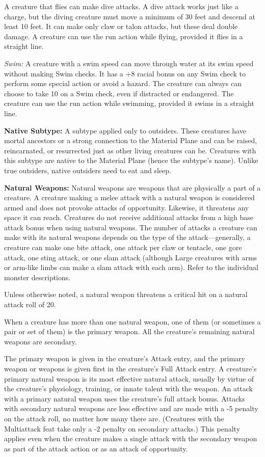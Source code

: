 \documentclass{article}
\begin{document}
A creature that flies can make dive attacks. A dive attack works just like a charge, 
but the diving creature must move a minimum of 30 feet and descend at least 10 
feet. It can make only claw or talon attacks, but these deal double damage. A creature 
can use the run action while flying, provided it flies in a straight line. 

\textit{Swim: }A creature with a swim speed can move through water at its swim 
speed without making Swim checks. It has a +8 racial bonus on any Swim check to 
perform some special action or avoid a hazard. The creature can always can choose 
to take 10 on a Swim check, even if distracted or endangered. The creature can 
use the run action while swimming, provided it swims in a straight line. 

\vspace{12pt}
\textbf{Native Subtype:} A subtype applied only to outsiders. These creatures have 
mortal ancestors or a strong connection to the Material Plane and can be raised, 
reincarnated, or resurrected just as other living creatures can be. Creatures with 
this subtype are native to the Material Plane (hence the subtype's name). Unlike 
true outsiders, native outsiders need to eat and sleep. 

\vspace{12pt}
\textbf{Natural Weapons:} Natural weapons are weapons that are physically a part 
of a creature. A creature making a melee attack with a natural weapon is considered 
armed and does not provoke attacks of opportunity. Likewise, it threatens any space 
it can reach. Creatures do not receive additional attacks from a high base attack 
bonus when using natural weapons. The number of attacks a creature can make with 
its natural weapons depends on the type of the attack---generally, a creature can 
make one bite attack, one attack per claw or tentacle, one gore attack, one sting 
attack, or one slam attack (although Large creatures with arms or arm-like limbs 
can make a slam attack with each arm). Refer to the individual monster descriptions.

Unless otherwise noted, a natural weapon threatens a critical hit on a natural 
attack roll of 20.

When a creature has more than one natural weapon, one of them (or sometimes a pair 
or set of them) is the primary weapon. All the creature's remaining natural weapons 
are secondary. 

The primary weapon is given in the creature's Attack entry, and the primary weapon 
or weapons is given first in the creature's Full Attack entry. A creature's primary 
natural weapon is its most effective natural attack, usually by virtue of the creature's 
physiology, training, or innate talent with the weapon. An attack with a primary 
natural weapon uses the creature's full attack bonus. Attacks with secondary natural 
weapons are less effective and are made with a -5 penalty on the attack roll, no 
matter how many there are. (Creatures with the Multiattack feat take only a -2 
penalty on secondary attacks.) This penalty applies even when the creature makes 
a single attack with the secondary weapon as part of the attack action or as an 
attack of opportunity.
\end{document}
